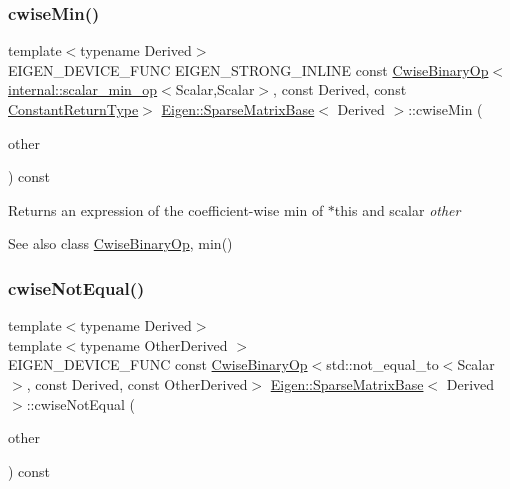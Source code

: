 \subsubsection{\texorpdfstring{cwiseMin()}{cwiseMin()}\hspace{0.1cm}{\footnotesize\ttfamily [2/2]}}
{\footnotesize\ttfamily template$<$typename Derived$>$ \\
E\+I\+G\+E\+N\+\_\+\+D\+E\+V\+I\+C\+E\+\_\+\+F\+U\+NC E\+I\+G\+E\+N\+\_\+\+S\+T\+R\+O\+N\+G\+\_\+\+I\+N\+L\+I\+NE const \mbox{\hyperlink{class_eigen_1_1_cwise_binary_op}{Cwise\+Binary\+Op}}$<$\mbox{\hyperlink{struct_eigen_1_1internal_1_1scalar__min__op}{internal\+::scalar\+\_\+min\+\_\+op}}$<$Scalar,Scalar$>$, const Derived, const \mbox{\hyperlink{class_eigen_1_1_cwise_nullary_op}{Constant\+Return\+Type}}$>$ \mbox{\hyperlink{class_eigen_1_1_sparse_matrix_base}{Eigen\+::\+Sparse\+Matrix\+Base}}$<$ Derived $>$\+::cwise\+Min (\begin{DoxyParamCaption}\item[{const Scalar \&}]{other }\end{DoxyParamCaption}) const\hspace{0.3cm}{\ttfamily [inline]}}

\begin{DoxyReturn}{Returns}
an expression of the coefficient-\/wise min of $\ast$this and scalar {\itshape other} 
\end{DoxyReturn}
\begin{DoxySeeAlso}{See also}
class \mbox{\hyperlink{class_eigen_1_1_cwise_binary_op}{Cwise\+Binary\+Op}}, min() 
\end{DoxySeeAlso}
\mbox{\label{class_eigen_1_1_sparse_matrix_base_a343a8ed411a643f1ca3ebd5bc28d0d97}} 
\subsubsection{\texorpdfstring{cwiseNotEqual()}{cwiseNotEqual()}}
{\footnotesize\ttfamily template$<$typename Derived$>$ \\
template$<$typename Other\+Derived $>$ \\
E\+I\+G\+E\+N\+\_\+\+D\+E\+V\+I\+C\+E\+\_\+\+F\+U\+NC const \mbox{\hyperlink{class_eigen_1_1_cwise_binary_op}{Cwise\+Binary\+Op}}$<$std\+::not\+\_\+equal\+\_\+to$<$Scalar$>$, const Derived, const Other\+Derived$>$ \mbox{\hyperlink{class_eigen_1_1_sparse_matrix_base}{Eigen\+::\+Sparse\+Matrix\+Base}}$<$ Derived $>$\+::cwise\+Not\+Equal (\begin{DoxyParamCaption}\item[{const E\+I\+G\+E\+N\+\_\+\+C\+U\+R\+R\+E\+N\+T\+\_\+\+S\+T\+O\+R\+A\+G\+E\+\_\+\+B\+A\+S\+E\+\_\+\+C\+L\+A\+SS$<$ Other\+Derived $>$ \&}]{other }\end{DoxyParamCaption}) const\hspace{0.3cm}{\ttfamily [inline]}}

